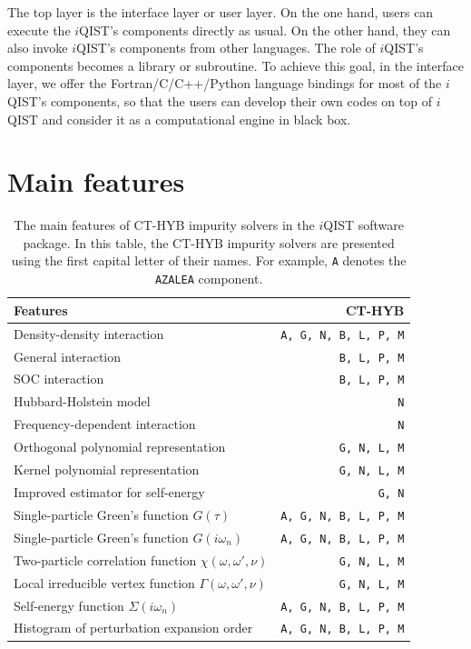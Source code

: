 The top layer is the interface layer or user layer. On the one hand, users can execute the $i$QIST's components directly as usual. On the other hand, they can also invoke $i$QIST's components from other languages. The role of $i$QIST's components becomes a library or subroutine. To achieve this goal, in the interface layer, we offer the Fortran/C/C++/Python language bindings for most of the $i$QIST's components, so that the users can develop their own codes on top of $i$QIST and consider it as a computational engine in black box.

\section{Main features}
\begin{longtable}{lr}
\caption{The main features of CT-HYB impurity solvers in the $i$QIST software package. In this table, the CT-HYB impurity solvers are presented using the first capital letter of their names. For example, \texttt{A} denotes the \texttt{AZALEA} component. \label{tab:feature}}\\
\hline\hline
Features & CT-HYB \\
\hline
Density-density interaction & \texttt{A, G, N, B, L, P, M}\\
General interaction & \texttt{B, L, P, M} \\
SOC interaction & \texttt{B, L, P, M} \\
Hubbard-Holstein model & \texttt{N} \\
Frequency-dependent interaction & \texttt{N} \\
\hline
Orthogonal polynomial representation & \texttt{G, N, L, M} \\
Kernel polynomial representation & \texttt{G, N, L, M} \\
Improved estimator for self-energy & \texttt{G, N} \\
\hline
Single-particle Green's function $G(\tau)$ & \texttt{A, G, N, B, L, P, M} \\
Single-particle Green's function $G(i\omega_n)$ & \texttt{A, G, N, B, L, P, M} \\
Two-particle correlation function $\chi(\omega, \omega', \nu)$ & \texttt{G, N, L, M} \\
Local irreducible vertex function $\Gamma(\omega, \omega', \nu)$ & \texttt{G, N, L, M} \\
Self-energy function $\Sigma(i\omega_n)$ & \texttt{A, G, N, B, L, P, M} \\
Histogram of perturbation expansion order & \texttt{A, G, N, B, L, P, M} \\

\end{longtable}
